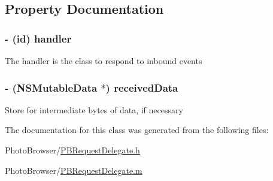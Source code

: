 \subsection{Property Documentation}
\hypertarget{interface_p_b_request_delegate_a2e9c42e929a2260dbea48ac0d0136e7a}{
\subsubsection[{handler}]{\setlength{\rightskip}{0pt plus 5cm}-\/ (id) handler}}
\label{interface_p_b_request_delegate_a2e9c42e929a2260dbea48ac0d0136e7a}
The handler is the class to respond to inbound events \hypertarget{interface_p_b_request_delegate_af791281e7c89b398f47ca32063a1d2fa}{
\subsubsection[{receivedData}]{\setlength{\rightskip}{0pt plus 5cm}-\/ (NSMutableData $\ast$) receivedData}}
\label{interface_p_b_request_delegate_af791281e7c89b398f47ca32063a1d2fa}
Store for intermediate bytes of data, if necessary 

The documentation for this class was generated from the following files:\begin{DoxyCompactItemize}
\item 
PhotoBrowser/\hyperlink{_p_b_request_delegate_8h}{PBRequestDelegate.h}\item 
PhotoBrowser/\hyperlink{_p_b_request_delegate_8m}{PBRequestDelegate.m}\end{DoxyCompactItemize}

